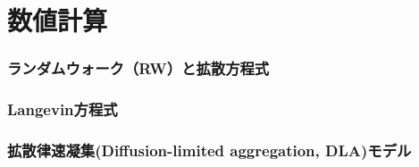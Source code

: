 \documentclass[autodetect-engine,dvi=dvipdfmx,a4paper,ja=standard,oneside,openany,11pt,draft]{bxjsarticle}
\begin{document}
\part{数値計算}
\section{ランダムウォーク（RW）と拡散方程式}
\section{Langevin方程式}
\section{拡散律速凝集(Diffusion-limited aggregation, DLA)モデル}
\ifdraft{
  
  
}{}
\end{document}
